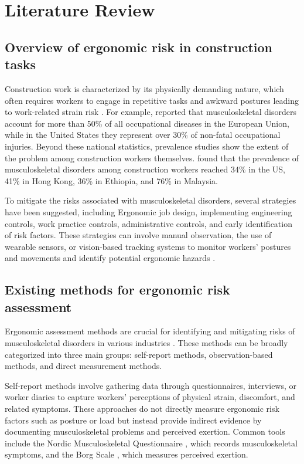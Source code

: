 \documentclass[11pt]{article}
\begin{document}
\section{Literature Review}

\subsection{Overview of ergonomic risk in construction tasks}
Construction work is characterized by its physically demanding nature, which often requires workers to engage in repetitive tasks and awkward postures leading to work-related strain risk \citep{inyang2012ergonomic}. For example, \citet{massirisfernandez2020ergonomic} reported that musculoskeletal disorders account for more than 50\% of all occupational diseases in the European Union, while in the United States they represent over 30\% of non-fatal occupational injuries. Beyond these national statistics, prevalence studies show the extent of the problem among construction workers themselves. \citet{chen2024automatic} found that the prevalence of musculoskeletal disorders among construction workers reached 34\% in the US, 41\% in Hong Kong, 36\% in Ethiopia, and 76\% in Malaysia.

To mitigate the risks associated with musculoskeletal disorders, several strategies have been suggested, including Ergonomic job design, implementing engineering controls, work practice controls, administrative controls, and early identification of risk factors. These strategies can involve manual observation, the use of wearable sensors, or vision-based tracking systems to monitor workers’ postures and movements and identify potential ergonomic hazards \citep{antwi2018wearable}.

\subsection{Existing methods for ergonomic risk assessment}

Ergonomic assessment methods are crucial for identifying and mitigating risks of musculoskeletal disorders in various industries \citep{tao2024evaluation}. These methods can be broadly categorized into three main groups: self-report methods, observation-based methods, and direct measurement methods. 

Self-report methods involve gathering data through questionnaires, interviews, or worker diaries to capture workers’ perceptions of physical strain, discomfort, and related symptoms. These approaches do not directly measure ergonomic risk factors such as posture or load but instead provide indirect evidence by documenting musculoskeletal problems and perceived exertion. Common tools include the Nordic Musculoskeletal Questionnaire \citep{kuorinka1987standardised}, which records musculoskeletal symptoms, and the Borg Scale \citep{borg1982psychophysical}, which measures perceived exertion.
\end{document}
